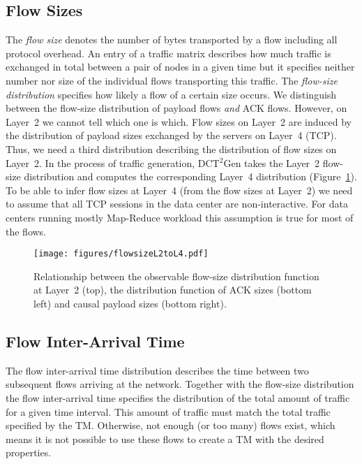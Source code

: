 \documentclass[journal,10pt]{IEEEtran}
\newcommand{\genname}{DCT${^2}$Gen}
\newcommand{\lt}{Layer~2}
\begin{document}
		


	\subsection{Flow Sizes}
\label{sec:flow-sizes}
		The \emph{flow size} denotes the number of bytes transported by a flow including all protocol overhead.
An entry of a traffic matrix describes how much traffic is exchanged in total between a pair of nodes in a given time but it specifies neither
		number nor size of the individual flows transporting this traffic.
		The \emph{flow-size distribution} specifies how likely a flow of a certain size occurs.
		We distinguish between the flow-size distribution of payload flows \emph{and} ACK flows. 
		However, on Layer~2 we cannot tell which one is which.
		Flow sizes on Layer~2 are induced by the distribution of payload sizes exchanged by the servers on Layer~4 (TCP).
		Thus, we need a third distribution describing the distribution of flow sizes on \lt{}.
		In the process of traffic generation, \genname{} takes the Layer~2 flow-size distribution and computes the corresponding Layer~4 distribution 
		(Figure~\ref{fig:flowsizeL2toL4}).
To be able to infer flow sizes at Layer~4 (from the flow sizes at \lt{}) we need to assume that all TCP sessions in the data center are non-interactive.
		For data centers running mostly Map-Reduce workload this assumption is true for most of the flows.
		
\begin{figure}
	\centering
	\texttt{[image: figures/flowsizeL2toL4.pdf]}
	\caption{Relationship between the observable flow-size distribution function at Layer~2 (top), the distribution function of ACK sizes (bottom left) and
	causal payload sizes (bottom right).}
	\label{fig:flowsizeL2toL4}
\end{figure}
		
		


	\subsection{Flow Inter-Arrival Time}
\label{sec:flow-inter-arrival}
	The flow inter-arrival time distribution describes the time between two subsequent flows arriving at the network.
	Together with the flow-size distribution the flow inter-arrival time specifies the distribution of the total amount of traffic
	for a given time interval.
	This amount of traffic must match the total traffic specified by the TM.
	Otherwise, not enough (or too many) flows exist, which means it is not possible to use these flows to create a TM with the desired properties.
	
\end{document}
